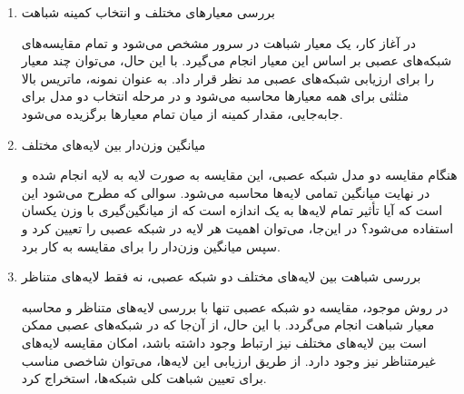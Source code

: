 %
%
%
%
%
%
%
%
%
%


\begin{enumerate}
	\item
	بررسی معیارهای مختلف و انتخاب کمینه شباهت
	
	در آغاز کار، یک معیار شباهت در سرور مشخص می‌شود و تمام مقایسه‌های شبکه‌های عصبی بر اساس این معیار انجام می‌گیرد. با این حال، می‌توان چند معیار را برای ارزیابی شبکه‌های عصبی مد نظر قرار داد. به عنوان نمونه، ماتریس بالا ‌مثلثی برای همه معیارها محاسبه می‌شود و در مرحله انتخاب دو مدل برای جابه‌جایی، مقدار کمینه از میان تمام معیارها برگزیده می‌شود.
	
	
	\item
	میانگین وزن‌دار بین لایه‌های مختلف
	
هنگام مقایسه دو مدل شبکه عصبی، این مقایسه به صورت لایه به لایه انجام شده و در نهایت میانگین تمامی لایه‌ها محاسبه می‌شود. سوالی که مطرح می‌شود این است که آیا تأثیر تمام لایه‌ها به یک اندازه است که از میانگین‌گیری با وزن یکسان استفاده می‌شود؟ در این‌جا، می‌توان اهمیت هر لایه در شبکه عصبی را تعیین کرد و سپس میانگین وزن‌دار را برای مقایسه به کار برد.
	

	\item
بررسی شباهت بین لایه‌های مختلف دو شبکه عصبی، نه فقط لایه‌های متناظر

در روش موجود، مقایسه دو شبکه عصبی تنها با بررسی لایه‌های متناظر و محاسبه معیار شباهت انجام می‌گردد. با این حال، از آن‌جا که در شبکه‌های عصبی ممکن است بین لایه‌های مختلف نیز ارتباط وجود داشته باشد، امکان مقایسه لایه‌های غیرمتناظر نیز وجود دارد. از طریق ارزیابی این لایه‌ها، می‌توان شاخصی مناسب برای تعیین شباهت کلی شبکه‌ها، استخراج کرد.
\end{enumerate}



